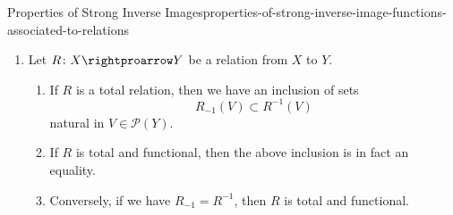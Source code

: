 \begin{proposition}{Properties of Strong Inverse Images}{properties-of-strong-inverse-image-functions-associated-to-relations}
\begin{enumerate}
\[                =%
                X\setminus R^{-1}(Y\setminus V)
            \]%
            for each $V\in\mathcal{P}(Y)$.
        \item\label{properties-of-strong-inverse-image-functions-associated-to-relations-interaction-with-weak-inverse-images-2}Let $R\colon X\rightproarrow Y$ be a relation from $X$ to $Y$.
            \begin{enumerate}
                \item\label{properties-of-strong-inverse-image-functions-associated-to-relations-interaction-with-weak-inverse-images-2-a}If $R$ is a total relation, then we have an inclusion of sets
                    \[
                        R_{-1}(V)
                        \subset
                        R^{-1}(V)
                    \]%
                    natural in $V\in\mathcal{P}(Y)$.
                \item\label{properties-of-strong-inverse-image-functions-associated-to-relations-interaction-with-weak-inverse-images-2-b}If $R$ is total and functional, then the above inclusion is in fact an equality.
                \item\label{properties-of-strong-inverse-image-functions-associated-to-relations-interaction-with-weak-inverse-images-2-c}Conversely, if we have $R_{-1}=R^{-1}$, then $R$ is total and functional.
            \end{enumerate}
    \end{enumerate}
\end{proposition}
